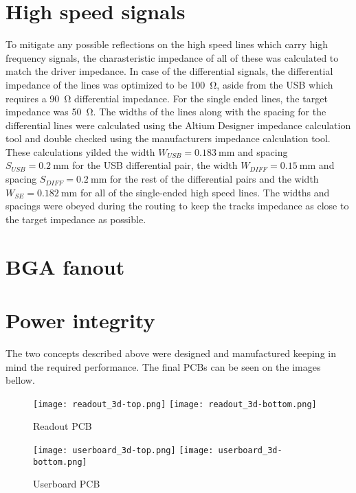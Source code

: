 \section{High speed signals}
To mitigate any possible reflections on the high speed lines which carry high frequency signals, the charasteristic impedance of all of these was calculated to match the driver impedance. In case of the differential signals, the differential impedance of the lines was optimized to be \SI{100}{\ohm}, aside from the USB which requires a \SI{90}{\ohm} differential impedance. For the single ended lines, the target impedance was \SI{50}{\ohm}. The widths of the lines along with the spacing for the differential lines were calculated using the Altium Designer impedance calculation tool and double checked using the manufacturers impedance calculation tool. These calculations yilded the width $W_{USB} = \SI{0.183}{\milli\meter}$ and spacing $S_{USB} = \SI{0.2}{\milli\meter}$ for the USB differential pair, the width $W_{DIFF} = \SI{0.15}{\milli\meter}$ and spacing $S_{DIFF} = \SI{0.2}{\milli\meter}$ for the rest of the differential pairs and the width $W_{SE} = \SI{0.182}{\milli\meter}$ for all of the single-ended high speed lines. The widths and spacings were obeyed during the routing to keep the tracks impedance as close to the target impedance as possible.

\section{BGA fanout}


\section{Power integrity}

The two concepts described above were designed and manufactured keeping in mind the required performance. The final PCBs can be seen on the images bellow. 
\newpage
\FloatBarrier
\begin{figure}[htp!]
    \centering
    \texttt{[image: readout\_3d-top.png]}
    \texttt{[image: readout\_3d-bottom.png]}
    \caption{Readout PCB}
    \label{fig:readout_3d}
\end{figure}
\FloatBarrier

\FloatBarrier
\begin{figure}[htp!]
    \centering
    \texttt{[image: userboard\_3d-top.png]}
    \hspace{1.8cm}
    \texttt{[image: userboard\_3d-bottom.png]}
    \caption{Userboard PCB}
    \label{fig:userboard_3d}
\end{figure}
\FloatBarrier
